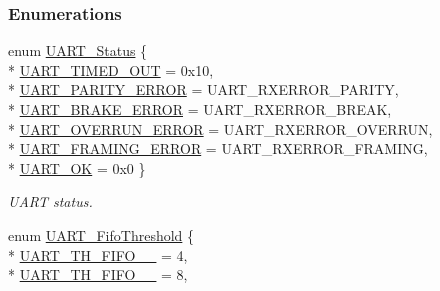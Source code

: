 \subsubsection*{Enumerations}
\begin{DoxyCompactItemize}
\item 
enum \hyperlink{_u_a_r_t_c_c26_x_x_8h_a778bbef5f4b52a5651552136715f53c4}{U\+A\+R\+T\+\_\+\+Status} \{ \\*
\hyperlink{_u_a_r_t_c_c26_x_x_8h_a778bbef5f4b52a5651552136715f53c4aa965b1df388dcc5c87f1bb51120877c7}{U\+A\+R\+T\+\_\+\+T\+I\+M\+E\+D\+\_\+\+O\+U\+T} = 0x10, 
\\*
\hyperlink{_u_a_r_t_c_c26_x_x_8h_a778bbef5f4b52a5651552136715f53c4a505840052f6bf71374b427575c23e929}{U\+A\+R\+T\+\_\+\+P\+A\+R\+I\+T\+Y\+\_\+\+E\+R\+R\+O\+R} = U\+A\+R\+T\+\_\+\+R\+X\+E\+R\+R\+O\+R\+\_\+\+P\+A\+R\+I\+T\+Y, 
\\*
\hyperlink{_u_a_r_t_c_c26_x_x_8h_a778bbef5f4b52a5651552136715f53c4aeadc3b97f933501a079b1f300a92a01a}{U\+A\+R\+T\+\_\+\+B\+R\+A\+K\+E\+\_\+\+E\+R\+R\+O\+R} = U\+A\+R\+T\+\_\+\+R\+X\+E\+R\+R\+O\+R\+\_\+\+B\+R\+E\+A\+K, 
\\*
\hyperlink{_u_a_r_t_c_c26_x_x_8h_a778bbef5f4b52a5651552136715f53c4a261d411fd495e2312aad0c43a01fc050}{U\+A\+R\+T\+\_\+\+O\+V\+E\+R\+R\+U\+N\+\_\+\+E\+R\+R\+O\+R} = U\+A\+R\+T\+\_\+\+R\+X\+E\+R\+R\+O\+R\+\_\+\+O\+V\+E\+R\+R\+U\+N, 
\\*
\hyperlink{_u_a_r_t_c_c26_x_x_8h_a778bbef5f4b52a5651552136715f53c4a2e97f20086d32b1d2c9f276351bcc100}{U\+A\+R\+T\+\_\+\+F\+R\+A\+M\+I\+N\+G\+\_\+\+E\+R\+R\+O\+R} = U\+A\+R\+T\+\_\+\+R\+X\+E\+R\+R\+O\+R\+\_\+\+F\+R\+A\+M\+I\+N\+G, 
\\*
\hyperlink{_u_a_r_t_c_c26_x_x_8h_a778bbef5f4b52a5651552136715f53c4a525187963c0aaa465f2a35b30b894d07}{U\+A\+R\+T\+\_\+\+O\+K} = 0x0
 \}
\begin{DoxyCompactList}\small\item\em U\+A\+R\+T status. \end{DoxyCompactList}\item 
enum \hyperlink{_u_a_r_t_c_c26_x_x_8h_a292a5e751577698b215f5e8aa1c79e99}{U\+A\+R\+T\+\_\+\+Fifo\+Threshold} \{ \\*
\hyperlink{_u_a_r_t_c_c26_x_x_8h_a292a5e751577698b215f5e8aa1c79e99a56bece2b58d0dab3674c00ece3197fff}{U\+A\+R\+T\+\_\+\+T\+H\+\_\+\+F\+I\+F\+O\+\_\+\_} = 4, 
\\*
\hyperlink{_u_a_r_t_c_c26_x_x_8h_a292a5e751577698b215f5e8aa1c79e99a3c1979202b738122bab4924378108a42}{U\+A\+R\+T\+\_\+\+T\+H\+\_\+\+F\+I\+F\+O\+\_\+\_} = 8, 

\end{DoxyCompactItemize}
